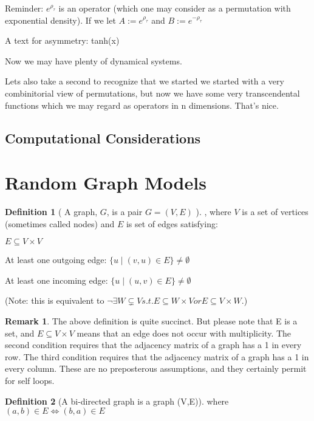 \documentclass{article}
\theoremstyle{definition}
\newtheorem{definition}{Definition}
\newtheorem*{remark}{Remark}
\begin{document}
Reminder: $e^{\rho_\tau}$ is an operator (which one may consider as a permutation with exponential density). If we let $A := e^{\rho_\tau} $ and $B:= e^{-\rho_\tau}$

A text for asymmetry: tanh(x)

Now we may have plenty of dynamical systems.

Lets also take a second to recognize that we started we started with a very combinitorial view of permutations, but now we have some very transcendental functions which we may regard as operators in n dimensions. That's nice.

\subsection{Computational Considerations}

\section{Random Graph Models}
\begin{definition}[ A graph, $G$, is a pair $G=(V,E)$ ], where $V$ is a set of vertices (sometimes called nodes) and $E$ is set of edges satisfying:
\item $E \subseteq V \times V $
\item At least one outgoing edge: $ \{ u \mid (v,u) \in E\} \neq \emptyset $
\item At least one incoming edge: $ \{ u \mid (u,v) \in E\} \neq \emptyset $
\end{definition}

(Note: this is equivalent to $ \neg \exists W \subsetneq V s.t. E \subseteq W\times V  or E \subseteq V\times W $.)

\begin{remark} The above definition is quite succinct. But please note that E is a set, and $E \subseteq V \times V$ means that an edge does not occur with multiplicity. The second condition requires that the adjacency matrix of a graph has a 1 in every row. The third condition requires that the adjacency matrix of a graph has a 1 in every column. These are no preposterous assumptions, and they certainly permit for self loops.
\end{remark}

\begin{definition}[A bi-directed graph is a graph (V,E)] where $(a,b) \in E \iff (b,a) \in E$ \end{definition}
\end{document}
